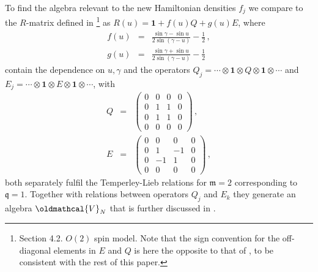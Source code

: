 \documentclass[a4paper,10pt]{article}
\newcommand{\q}{\mathfrak{q}}
\newcommand{\linnea}[1]{$\framebox{\tiny L}$\ \textbf{\texttt{{\color{red}\footnotesize#1}}}}
\begin{document}
To find the algebra relevant to the new Hamiltonian densities $f_j$ we compare to the $R$-matrix defined in \cite{Candu}\footnote{Section 4.2. $O(2)$ spin model. Note that the sign convention for the off-diagonal elements in $E$ and $Q$ is here the opposite to that of \cite{Candu}, to be consistent with the rest of this paper.} as $R(u)=\mathbf{1}+f(u)Q+g(u)E$, where
\begin{subequations}
\begin{eqnarray}
f(u) &=& \frac{\sin\gamma - \sin u}{2\sin(\gamma-u)} - \frac{1}{2} \,, \\
g(u) &=&  \frac{\sin\gamma + \sin u}{2\sin(\gamma-u)} - \frac{1}{2}
\end{eqnarray}
\end{subequations}
contain the dependence on $u,\gamma$ and the operators $Q_j=\cdots\otimes\mathbf{1}\otimes Q\otimes\mathbf{1}\otimes\cdots$ and $E_j=\cdots\otimes\mathbf{1}\otimes E\otimes\mathbf{1}\otimes\cdots$, with
\begin{subequations}
\begin{eqnarray}
Q &=& \begin{pmatrix}
0 & 0 & 0 & 0 \\
0 & 1 & 1 & 0\\
0 & 1 & 1 & 0\\
0 & 0 & 0 & 0 
\end{pmatrix} \,, \label{Qmatrix} \\ 
E &=& \begin{pmatrix}
0 & 0 & 0 & 0 \\
0 & 1 & -1 & 0\\
0 & -1 & 1 & 0\\
0 & 0 & 0 & 0 
\end{pmatrix} \,,    \label{Ematrix}
\end{eqnarray}
\end{subequations}
both separately fulfil the Temperley-Lieb relations for $\mathfrak{m}=2$ corresponding to $\q=1$. Together with relations between operators $Q_j$ and $E_k$ they generate an algebra $\oldmathcal{V}_N$ that is further discussed in \cite{Candu}. %
\end{document}
